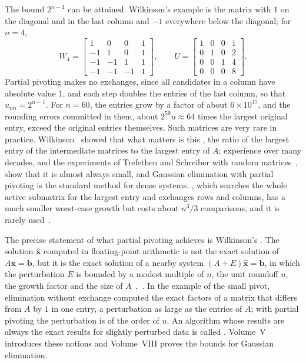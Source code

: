 The bound $2^{n-1}$ can be attained. Wilkinson's example is the matrix with $1$ on the diagonal and in the last column and $-1$ everywhere below the diagonal; for $n=4$,
\[
W_4=\begin{bmatrix}1&0&0&1\\-1&1&0&1\\-1&-1&1&1\\-1&-1&-1&1\end{bmatrix},\qquad U=\begin{bmatrix}1&0&0&1\\0&1&0&2\\0&0&1&4\\0&0&0&8\end{bmatrix}.
\]
Partial pivoting makes no exchanges, since all candidates in a column have absolute value $1$, and each step doubles the entries of the last column, so that $u_{nn}=2^{n-1}$. For $n=60$, the entries grow by a factor of about $6\times10^{17}$, and the rounding errors committed in them, about $2^{59}u\approx64$ times the largest original entry, exceed the original entries themselves. Such matrices are very rare in practice. Wilkinson~\cite{wilkinson1961} showed that what matters is this , the ratio of the largest entry of the intermediate matrices to the largest entry of $A$; experience over many decades, and the experiments of Trefethen and Schreiber with random matrices~\cite{trefethen1990}, show that it is almost always small, and Gaussian elimination with partial pivoting is the standard method for dense systems. , which searches the whole active submatrix for the largest entry and exchanges rows and columns, has a much smaller worst-case growth but costs about $n^3/3$ comparisons, and it is rarely used~\cite[Sect.~9.4]{higham2002accuracy}.

The precise statement of what partial pivoting achieves is Wilkinson's . The solution $\hat{\mathbf x}$ computed in floating-point arithmetic is not the exact solution of $A\mathbf x=\mathbf b$, but it is the exact solution of a nearby system $(A+E)\hat{\mathbf x}=\mathbf b$, in which the perturbation $E$ is bounded by a modest multiple of $n$, the unit roundoff $u$, the growth factor and the size of $A$~\cite{wilkinson1961},~\cite[Chap.~9]{higham2002accuracy}. In the example of the small pivot, elimination without exchange computed the exact factors of a matrix that differs from $A$ by $1$ in one entry, a perturbation as large as the entries of $A$; with partial pivoting the perturbation is of the order of $u$. An algorithm whose results are always the exact results for slightly perturbed data is called . Volume~V introduces these notions and Volume~VIII proves the bounds for Gaussian elimination.

